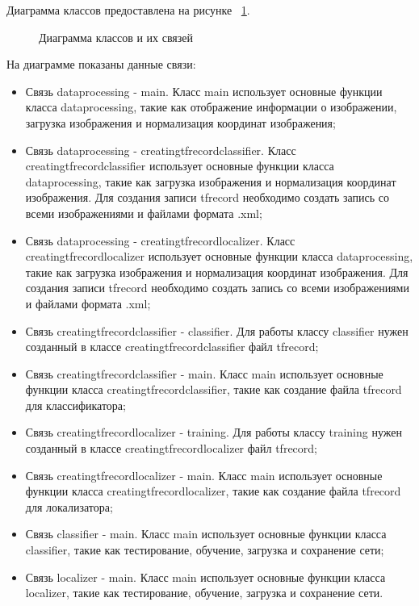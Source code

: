 Диаграмма классов предоставлена на рисунке ~\ref{classdiag:image}.

\begin{figure}[H]
\caption{Диаграмма классов и их связей}
\label{classdiag:image}
\end{figure}

На диаграмме показаны данные связи:
\begin{itemize}
	\item Связь dataprocessing - main. Класс main использует основные функции класса dataprocessing, такие как отображение информации о изображении, загрузка изображения и нормализация координат изображения;
	\item Связь dataprocessing - creatingtfrecordclassifier. Класс creatingtfrecordclassifier использует основные функции класса dataprocessing, такие как загрузка изображения и нормализация координат изображения. Для создания записи tfrecord необходимо создать запись со всеми изображениями и файлами формата .xml;
	\item Связь dataprocessing - creatingtfrecordlocalizer. Класс creatingtfrecordlocalizer использует основные функции класса dataprocessing, такие как загрузка изображения и нормализация координат изображения. Для создания записи tfrecord необходимо создать запись со всеми изображениями и файлами формата .xml;
	\item Связь creatingtfrecordclassifier - classifier. Для работы классу classifier нужен созданный в классе creatingtfrecordclassifier файл tfrecord;
	\item Связь creatingtfrecordclassifier - main.  Класс main использует основные функции класса creatingtfrecordclassifier, такие как создание файла tfrecord для классификатора;
	\item Связь creatingtfrecordlocalizer - training. Для работы классу training нужен созданный в классе creatingtfrecordlocalizer файл tfrecord;
	\item Связь creatingtfrecordlocalizer - main.  Класс main использует основные функции класса creatingtfrecordlocalizer, такие как создание файла tfrecord для локализатора;
	\item Связь classifier - main. Класс main использует основные функции класса classifier, такие как тестирование, обучение, загрузка и сохранение сети;
	\item Связь localizer - main. Класс main использует основные функции класса localizer, такие как тестирование, обучение, загрузка и сохранение сети.
\end{itemize}


